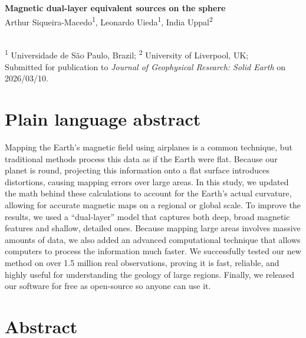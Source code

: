 \documentclass[onecolumn,10pt,a4paper]{article}
\newcommand{\Title}{Magnetic dual-layer equivalent sources on the sphere}
\newcommand{\SubmittedOn}{2026/03/10}
\newcommand{\PublishedOn}{2026/02/28}
\newcommand{\Authors}{%
  Arthur Siqueira-Macedo\textsuperscript{1},
  Leonardo Uieda\textsuperscript{1},
  India Uppal\textsuperscript{2}
}
\newcommand{\Affiliations}{%
  \textsuperscript{1} Universidade de São Paulo, Brazil;
  \textsuperscript{2} University of Liverpool, UK;
}
\newcommand{\Journal}{Journal of Geophysical Research: Solid Earth}
\providecommand{\DIFaddtex}[1]{{\protect\color{blue}\uwave{#1}}} %
\providecommand{\DIFaddbegin}{} %
\providecommand{\DIFaddend}{} %
\providecommand{\DIFadd}[1]{\texorpdfstring{\DIFaddtex{#1}}{#1}} %
\newcommand{\DIFaddincludegraphics}[2][]{{\color{blue}\fbox{\DIFOincludegraphics[#1]{#2}}}} %
\DeclareRobustCommand{\DIFaddbegin}{\DIFOaddbegin \let\includegraphics\DIFaddincludegraphics} %
\DeclareRobustCommand{\DIFaddend}{\DIFOaddend \let\includegraphics\DIFOincludegraphics} %
\begin{document}
\begin{FlushLeft}
    {\Large\bfseries \Title}
    \\[0.3cm]
    \Authors
    \\[0.3cm]
    {\Affiliations}
    \\[0.3cm]
    {Submitted for publication to \textit{\Journal{}} on \SubmittedOn.}
\end{FlushLeft}

\linenumbers

\section*{Plain language abstract}

Mapping the Earth's magnetic field using airplanes is a common 
technique, but traditional \DIFaddbegin \DIFadd{modeling and gridding }\DIFaddend methods process this data as if the Earth were flat. 
Because our planet is round, projecting this information onto a flat surface 
introduces distortions, causing mapping errors over large areas. In this study, 
we updated the math behind these calculations to account for the Earth's actual 
curvature, allowing for accurate magnetic maps on a regional or global scale. 
To improve the results, we used a ``dual-layer'' model that captures both 
deep, broad magnetic features and shallow, detailed ones. Because mapping 
large areas involves massive amounts of data, we also added an advanced 
computational technique that allows computers to process the information much 
faster. We successfully tested our new method on over 1.5 million real 
observations, proving it is fast, reliable, and highly useful for 
understanding the geology of large regions. Finally, we released our software 
for free as open-source so anyone can use it.

\section*{Abstract}
\end{document}
